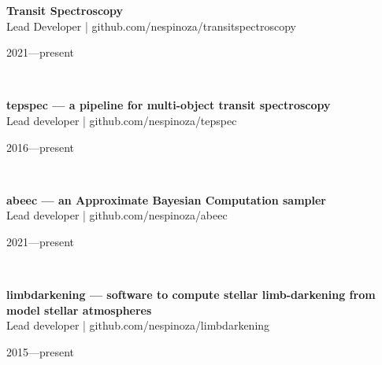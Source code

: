 \documentclass[12pt, a4paper]{article} %
\begin{document}
\begin{minipage}[t]{0.7\textwidth}
\begin{flushleft}%
  \setlength{\leftskip}{0.2cm}%
\textbf{Transit Spectroscopy}\\
Lead Developer  | github.com/nespinoza/transitspectroscopy
\end{flushleft}
\end{minipage}
\begin{minipage}[t]{0.3\textwidth}
\hfill 2021---present
\end{minipage}\\

\begin{minipage}[t]{0.7\textwidth}
\begin{flushleft}%
  \setlength{\leftskip}{0.2cm}%
\textbf{tepspec --- a pipeline for multi-object transit spectroscopy}\\
Lead developer | github.com/nespinoza/tepspec
\end{flushleft}
\end{minipage}
\begin{minipage}[t]{0.3\textwidth}
\hfill 2016---present
\end{minipage}\\

\begin{minipage}[t]{0.7\textwidth}
\begin{flushleft}%
  \setlength{\leftskip}{0.2cm}%
\textbf{abeec --- an Approximate Bayesian Computation sampler}\\
Lead developer | github.com/nespinoza/abeec
\end{flushleft}
\end{minipage}
\begin{minipage}[t]{0.3\textwidth}
\hfill 2021---present
\end{minipage}\\

\begin{minipage}[t]{0.7\textwidth}
\begin{flushleft}%
  \setlength{\leftskip}{0.2cm}%
\textbf{limbdarkening --- software to compute stellar limb-darkening from model stellar atmospheres}\\
Lead developer | github.com/nespinoza/limbdarkening
\end{flushleft}
\end{minipage}
\begin{minipage}[t]{0.3\textwidth}
\hfill 2015---present
\end{minipage}\\
\end{document}
